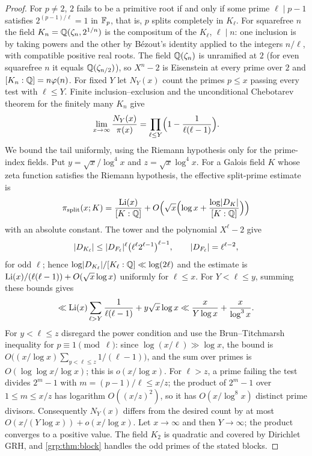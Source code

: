 \begin{proof}
For $p\ne2$, $2$ fails to be a primitive root if and only if some prime
$\ell\mid p-1$ satisfies $2^{(p-1)/\ell}=1$ in $\mathbb{F}_p$, that is, $p$ splits
completely in $K_\ell$. For squarefree $n$ the field
$K_n=\mathbb{Q}(\zeta_n,2^{1/n})$ is the compositum of the $K_\ell$, $\ell\mid n$: one
inclusion is by taking powers and the other by B\'ezout's identity applied to
the integers $n/\ell$, with compatible positive real roots. The field
$\mathbb{Q}(\zeta_n)$ is unramified at $2$ (for even squarefree $n$ it equals
$\mathbb{Q}(\zeta_{n/2})$), so $X^n-2$ is Eisenstein at every prime over $2$ and
$[K_n:\mathbb{Q}]=n\varphi(n)$. For fixed $Y$ let $N_Y(x)$ count the primes $p\le x$
passing every test with $\ell\le Y$. Finite inclusion--exclusion and the
unconditional Chebotarev theorem for the finitely many $K_n$ give
\[
 \lim_{x\to\infty}\frac{N_Y(x)}{\pi(x)}
 =\prod_{\ell\le Y}\Bigl(1-\frac1{\ell(\ell-1)}\Bigr).
\]
We bound the tail uniformly, using the Riemann hypothesis only for the
prime-index fields. Put $y=\sqrt x/\log^4x$ and $z=\sqrt x\log^4x$. For a
Galois field $K$ whose zeta function satisfies the Riemann hypothesis, the
effective split-prime estimate \cite{Moree2012Artin,FanPollack2025Counting} is
\[
 \pi_{\mathrm{split}}(x;K)=\frac{\operatorname{Li}(x)}{[K:\mathbb{Q}]}
 +O\Bigl(\sqrt x\Bigl(\log x+\frac{\log\lvert D_K\rvert}{[K:\mathbb{Q}]}\Bigr)\Bigr)
\]
with an absolute constant. The tower and the polynomial $X^\ell-2$ give
\[
 \lvert D_{K_\ell}\rvert\le\lvert D_{F_\ell}\rvert^\ell\bigl(\ell^\ell2^{\ell-1}\bigr)^{\ell-1},
 \qquad\lvert D_{F_\ell}\rvert=\ell^{\ell-2},
\]
for odd $\ell$; hence $\log\lvert D_{K_\ell}\rvert/[K_\ell:\mathbb{Q}]\ll\log(2\ell)$ and the
estimate is $\operatorname{Li}(x)/(\ell(\ell-1))+O(\sqrt x\log x)$ uniformly for
$\ell\le x$. For $Y<\ell\le y$, summing these bounds gives
\[
 \ll\operatorname{Li}(x)\sum_{\ell>Y}\frac1{\ell(\ell-1)}+y\sqrt x\log x
 \ll\frac x{Y\log x}+\frac x{\log^3x}.
\]
For $y<\ell\le z$ disregard the power condition and use the Brun--Titchmarsh
inequality for $p\equiv1\pmod\ell$: since $\log(x/\ell)\gg\log x$, the bound is
$O\bigl((x/\log x)\sum_{y<\ell\le z}1/(\ell-1)\bigr)$, and the sum over primes
is $O(\log\log x/\log x)$; this is $o(x/\log x)$. For $\ell>z$, a prime failing
the test divides $2^m-1$ with $m=(p-1)/\ell\le x/z$; the product of $2^m-1$
over $1\le m\le x/z$ has logarithm $O((x/z)^2)$, so it has $O(x/\log^8x)$
distinct prime divisors. Consequently $N_Y(x)$ differs from the desired count
by at most $O(x/(Y\log x))+o(x/\log x)$. Let $x\to\infty$ and then
$Y\to\infty$; the product converges to a positive value. The field $K_2$ is
quadratic and covered by Dirichlet GRH, and \cref{grp:thm:block} handles the
odd primes of the stated blocks.
\end{proof}


